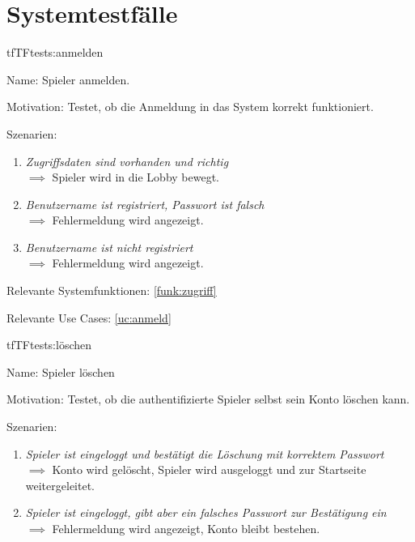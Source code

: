 \chapter{Systemtestfälle}

\setcounter{tf}{10}

\begin{description}[leftmargin=5em, style=sameline]

\begin{lhp}{tf}{TF}{tests:anmelden}
	\item [Name:] Spieler anmelden.
	\item [Motivation:] Testet, ob die Anmeldung in das System korrekt funktioniert.
	\item [Szenarien:] \hfill
		\begin{enumerate}
			\item \textit{Zugriffsdaten sind vorhanden und richtig} \\ $\implies$ Spieler wird in die Lobby bewegt.
			\item \textit{Benutzername ist registriert, Passwort ist falsch} \\ $\implies$ Fehlermeldung wird angezeigt.
			\item \textit{Benutzername ist nicht registriert} \\ $\implies$ Fehlermeldung wird angezeigt.
		\end{enumerate}
	\item [Relevante Systemfunktionen:] \ref{funk:zugriff}
	\item [Relevante Use Cases:] \ref{uc:anmeld}
\end{lhp}
\begin{lhp}{tf}{TF}{tests:löschen}
	\item [Name:] Spieler löschen
	\item [Motivation:] Testet, ob die authentifizierte 
          Spieler selbst  sein Konto löschen kann.
	\item [Szenarien:] \hfill
		\begin{enumerate}
			\item \textit{Spieler ist eingeloggt und bestätigt die Löschung mit korrektem Passwort} \\ $\implies$ Konto wird gelöscht, Spieler wird ausgeloggt und zur Startseite weitergeleitet.
			\item \textit{ Spieler ist eingeloggt, gibt aber ein falsches Passwort zur Bestätigung ein} \\ $\implies$ Fehlermeldung wird angezeigt, Konto bleibt bestehen.

\end{enumerate}
\end{lhp}
\end{description}
